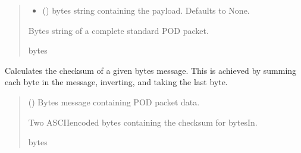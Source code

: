\documentclass[letterpaper,10pt,english]{sphinxmanual}
\begin{document}
\begin{fulllineitems}
\begin{fulllineitems}
\begin{quote}
\begin{description}
\begin{itemize}
\item {} 
\sphinxAtStartPar
{} (\sphinxstyleliteralemphasis{\sphinxupquote{ | }}\sphinxstyleliteralemphasis{\sphinxupquote{, }}) \textendash{} bytes string containing the payload. Defaults to None.

\end{itemize}

\sphinxAtStartPar
Bytes string of a complete standard POD packet.

\sphinxAtStartPar
bytes

\end{description}\end{quote}

\end{fulllineitems}


\begin{fulllineitems}
\label{\detokenize{PodApi.Devices:PodApi.Devices.BasicPodProtocol.Pod.Checksum}}
\pysigstartsignatures
{}
\pysigstopsignatures
\sphinxAtStartPar
Calculates the checksum of a given bytes message. This is achieved by summing each byte in the         message, inverting, and taking the last byte.
\begin{quote}\begin{description}
\sphinxAtStartPar
{} () \textendash{} Bytes message containing POD packet data.

\sphinxAtStartPar
Two ASCII\sphinxhyphen{}encoded bytes containing the checksum for bytesIn.

\sphinxAtStartPar
bytes

\end{description}\end{quote}


\end{fulllineitems}
\end{fulllineitems}
\end{document}
